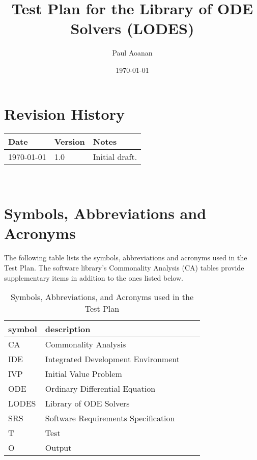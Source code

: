 \documentclass[12pt, titlepage]{article}
\newcommand{\famname}{LODES} %
\newcommand{\famdesc}{Library of ODE Solvers}
\begin{document}
\title{Test Plan for the Library of ODE Solvers (LODES)} 
\author{Paul Aoanan}
\date{\today}
	
\maketitle


\section{Revision History}
\begin{tabularx}{\textwidth}{p{3cm}p{2cm}X}
\toprule {\bf Date} & {\bf Version} & {\bf Notes}\\
\midrule
\today & 1.0 & Initial draft.\\
\bottomrule
\end{tabularx}

~\newpage

\section{Symbols, Abbreviations and Acronyms}
The following table lists the symbols, abbreviations and acronyms used in the Test Plan.
The software library's Commonality Analysis (CA) tables provide supplementary items in addition to the ones listed below.\\
\begin{table} [h]
\renewcommand{\arraystretch}{1.2}
\begin{tabular}{l l l l |} 
  \toprule		
  \textbf{symbol} & \textbf{description}\\
  \midrule 
  CA & Commonality Analysis\\
  IDE & Integrated Development Environment\\ 
  IVP & Initial Value Problem\\
  ODE & Ordinary Differential Equation\\
  \famname{} & \famdesc{}\\
  SRS & Software Requirements Specification\\
  T & Test\\
  O & Output\\
  \bottomrule
\end{tabular}\\
  \caption{Symbols, Abbreviations, and Acronyms used in the Test Plan}
  \label{Table:Table_Symbols}
\end{table}
\end{document}
